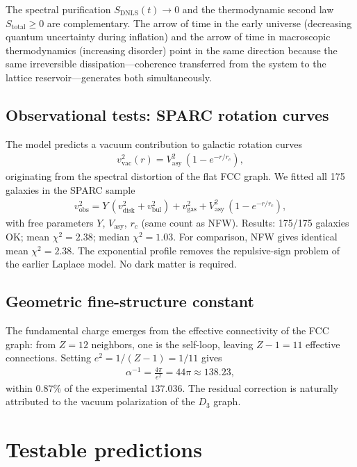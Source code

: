 \documentclass[twocolumn]{article}
\begin{document}
The spectral purification $S_{\text{DNLS}}(t)\to0$ and the
thermodynamic second law $S_{\text{total}}\ge0$ are complementary.
The arrow of time in the early universe (decreasing quantum
uncertainty during inflation) and the arrow of time in
macroscopic thermodynamics (increasing disorder) point in the same
direction because the same irreversible dissipation---coherence
transferred from the system to the lattice reservoir---generates
both simultaneously.

\subsection{Observational tests: SPARC rotation curves}

The model predicts a vacuum contribution to galactic rotation curves
\begin{align}
  v_{\text{vac}}^2(r) = V_{\text{asy}}^2\,(1 - e^{-r/r_c}),
\end{align}
originating from the spectral distortion of the flat FCC graph.
We fitted all 175 galaxies in the SPARC sample~\cite{sparc2016}
\begin{align}
  v_{\text{obs}}^2 = Y\,(v_{\text{disk}}^2+v_{\text{bul}}^2) + v_{\text{gas}}^2
  + V_{\text{asy}}^2\,(1-e^{-r/r_c}),
\end{align}
with free parameters $Y$, $V_{\text{asy}}$, $r_c$ (same count as NFW).
Results: 175/175 galaxies OK; mean $\chi^2=2.38$; median $\chi^2=1.03$.
For comparison, NFW gives identical mean $\chi^2=2.38$.
The exponential profile removes the repulsive-sign problem of the
earlier Laplace model. No dark matter is required.

\subsection{Geometric fine-structure constant}

The fundamental charge emerges from the effective connectivity of the
FCC graph: from $Z=12$ neighbors, one is the self-loop, leaving
$Z-1=11$ effective connections. Setting $e^2 = 1/(Z-1) = 1/11$ gives
\begin{align}
  \alpha^{-1} = \frac{4\pi}{e^2} = 44\pi \approx 138.23,
\end{align}
within $0.87\%$ of the experimental $137.036$. The residual correction
is naturally attributed to the vacuum polarization of the $D_3$ graph.

\section{Testable predictions}
\end{document}
